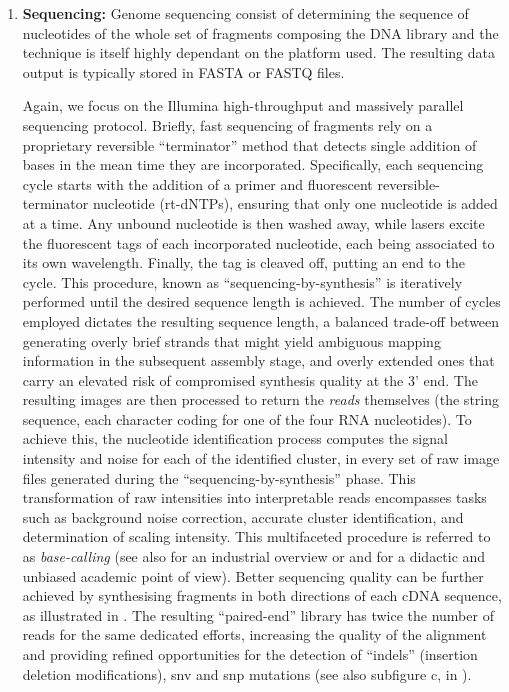 \begin{enumerate}[label=(\roman*)]
    \item \textbf{Sequencing:} Genome sequencing consist of determining the sequence of nucleotides of the whole set of fragments composing the DNA library and the technique is itself highly dependant on the platform used. The resulting data output is typically stored in \Gls{FASTA} or FASTQ files.
    
    Again, we focus on the Illumina high-throughput and massively parallel sequencing protocol. Briefly, fast sequencing of fragments rely on a proprietary reversible \enquote{terminator} method that detects single addition of bases in the mean time they are incorporated. Specifically, each sequencing cycle starts with the addition of a primer and fluorescent reversible-terminator nucleotide (rt-dNTPs), ensuring that only one nucleotide is added at a time. Any unbound nucleotide is then washed away, while lasers excite the fluorescent tags of each incorporated nucleotide, each being associated to its own wavelength. Finally, the tag is cleaved off, putting an end to the cycle. This procedure, known as \enquote{sequencing-by-synthesis} is iteratively performed until the desired sequence length is achieved. The number of cycles employed dictates the resulting sequence length, a balanced trade-off between generating overly brief strands that might yield ambiguous mapping information in the subsequent assembly stage, and overly extended ones that carry an elevated risk of compromised synthesis quality at the 3' end. 
    The resulting images are then processed to return the \emph{reads} themselves (the string sequence, each character coding for one of the four RNA nucleotides). To achieve this, the nucleotide identification process computes the signal intensity and noise for each of the identified cluster, in every set of raw image files generated during the \enquote{sequencing-by-synthesis} phase. This transformation of raw intensities into interpretable reads encompasses tasks such as background noise correction, accurate cluster identification, and determination of scaling intensity. This multifaceted procedure is referred to as \emph{base-calling} (see also \autocite{illumina23} for an industrial overview or \autocite{raghavendra_pullaiah18} and \autocite{meyer_kircher10} for a didactic and unbiased academic point of view).
    Better sequencing quality can be further achieved by synthesising fragments in both directions of each cDNA sequence, as illustrated in \autocite[Figure 4: Paired End Sequencing]{illumina23}. The resulting \enquote{paired-end} library has twice the number of reads for the same dedicated efforts, increasing the quality of the alignment and providing refined opportunities for the detection of \enquote{indels} (insertion deletion modifications), \acrshort{snv} and \acrshort{snp} mutations (see also subfigure c, in ).        
    

\end{enumerate}
